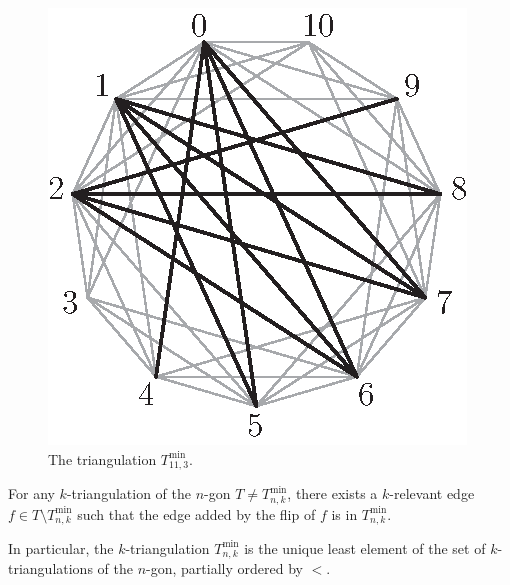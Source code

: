 \documentclass[12pt]{amsart}
\begin{document}
\begin{figure}
\centerline{\includegraphics[scale=1]{min.eps}}
\caption{\small{The triangulation $T_{11,3}^{\min}$.}}\label{min}
\end{figure}

\begin{lemma}\label{connexity}
For any $k$-triangulation of the $n$-gon $T\ne T_{n,k}^{\min}$, there exists a $k$-relevant edge $f\in T\setminus T_{n,k}^{\min}$ such that the edge added by the flip of $f$ is in $T_{n,k}^{\min}$.

In particular, the $k$-triangulation $T_{n,k}^{\min}$ is the unique least element of the set of $k$-triangulations of the $n$-gon, partially ordered by $<$.
\end{lemma}
\end{document}
